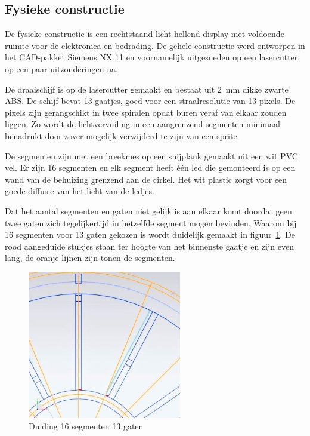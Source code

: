 \documentclass[12pt]{ugentreport}
\begin{document}
\subsection{Fysieke constructie}
De fysieke constructie is een rechtstaand licht hellend display met voldoende
ruimte voor de elektronica en bedrading. De gehele constructie werd ontworpen
in het CAD-pakket Siemens NX 11 en voornamelijk uitgesneden op een lasercutter,
op een paar uitzonderingen na.

De draaischijf is op de lasercutter gemaakt en bestaat uit \SI{2}{\milli\meter} dikke zwarte ABS.
De schijf bevat 13 gaatjes, goed voor een straalresolutie van 13 pixels. De pixels
zijn gerangschikt in twee spiralen opdat buren veraf van elkaar zouden liggen. Zo
wordt de lichtvervuiling in een aangrenzend segmenten minimaal benadrukt door
zover mogelijk verwijderd te zijn van een sprite.

De segmenten zijn met een breekmes op een snijplank gemaakt uit een wit PVC vel.
Er zijn 16 segmenten en elk segment heeft één led die gemonteerd is op een wand
van de behuizing grenzend aan de cirkel. Het wit plastic zorgt voor een goede
diffusie van het licht van de ledjes.

Dat het aantal segmenten en gaten niet gelijk is aan elkaar komt doordat geen
twee gaten zich tegelijkertijd in hetzelfde segment mogen bevinden. Waarom bij
16 segmenten voor 13 gaten gekozen is wordt duidelijk gemaakt in figuur~\ref{fig:duiding1316}. De
rood aangeduide stukjes staan ter hoogte van het binnenste gaatje en zijn even
lang, de oranje lijnen zijn tonen de segmenten.

\begin{figure}
  \centering
  \includegraphics[width=0.6\textwidth]{img/16vs13.jpg}
  \caption{Duiding 16 segmenten 13 gaten}
  \label{fig:duiding1316}
\end{figure}
\end{document}
